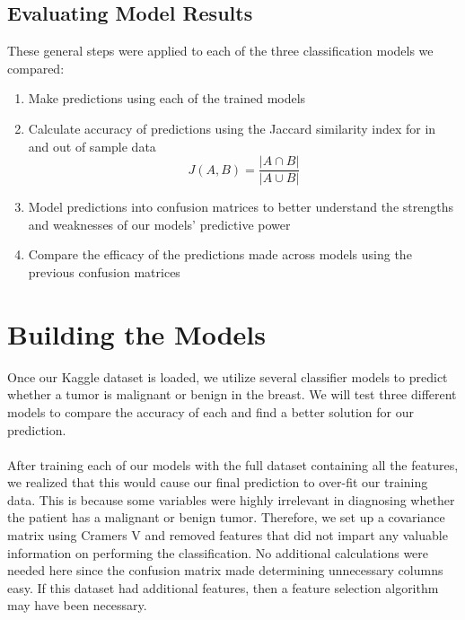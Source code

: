 \documentclass[twoside,twocolumn]{article}
\begin{document}
\subsection{Evaluating Model Results}
These general steps were applied to each of the three classification models we compared:
\begin{enumerate}
	\item Make predictions using each of the trained models
	\item Calculate accuracy of predictions using the Jaccard similarity index for in and out of sample data
	\begin{equation}
	\label{eq:emc}
	J(A,B) = \frac{|{A}\cap{B}|}{|{A}\cup{B}|}
	\end{equation}
	\item Model predictions into confusion matrices to better understand the strengths and weaknesses of our models' predictive power
        \item Compare the efficacy of the predictions made across models using the previous confusion matrices
\end {enumerate}



\section{Building the Models}
Once our Kaggle dataset is loaded, we utilize several classifier models to predict whether a tumor is malignant or benign in the breast. We will test three different models to compare the accuracy of each and find a better solution for our prediction.
\\ \\
After training each of our models with the full dataset containing all the features, we realized that this would cause our final prediction to over-fit our training data. This is because some variables were highly irrelevant in diagnosing whether the patient has a malignant or benign tumor. Therefore, we set up a covariance matrix using Cramers V and removed features that did not impart any valuable information on performing the classification. No additional calculations were needed here since the confusion matrix made determining unnecessary columns easy. If this dataset had additional features, then a feature selection algorithm may have been necessary.
\end{document}
